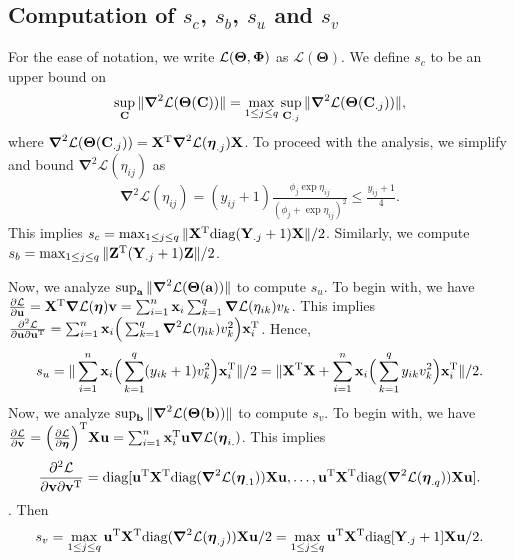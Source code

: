 \documentclass[12pt]{article}
\def\trans{^{\rm T}}
\newcommand{\bbL}{\mathcal{L}}
\newcommand{\bs}{\boldsymbol}
\begin{document}
\subsection{Computation of $s_c$, $s_b$, $s_u$ and $s_v$ } \label{par:comp_scale}
For the ease of notation, we write $ \bbL(\bs\Theta,\bPhi)$ as $ \bbL(\bs\Theta)$. 
We define $s_c$ to be an upper bound on %
\begin{align*}
\sup_{\C}\|\bs\nabla^2 \bbL(\bs\Theta({\C}))\|  = \max_{1\leq j \leq q} \sup_{\C_{.j}}\|\bs\nabla^2 \bbL(\bs\Theta({\C_{.j}}))\|, 
\end{align*}
where $\bs\nabla^2 \bbL(\bs\Theta({\C_{.j}})) = \X\trans \bs\nabla^2 \bbL(\bs\eta_{.j}) \X$. To proceed with the analysis, we simplify and bound   $\bs\nabla^2 \bbL(\eta_{ij}) $ as 
\begin{align*}
\bs\nabla^2 \bbL(\eta_{ij}) = (y_{ij} + 1)\frac{\phi_j \exp{\eta_{ij}} }{(\phi_j + \exp{\eta_{ij}})^2} \leq \frac{y_{ij} + 1}{4}. 
\end{align*}
This implies $s_c = \max_{1\leq j \leq q}  \|\X\trans\M{diag}(\Y_{.j}+1)\X \|/2$. Similarly, we compute $s_b = \max_{1\leq j \leq q}  \|\Z\trans(\Y_{.j}+1)\Z \|/2$. 

Now, we analyze $\sup_{\a}\|\bs\nabla^2 \bbL(\bs\Theta({\a}))\|$  to compute $s_u$.  To begin with, we have $\frac{\partial\bbL }{\partial \u} = \X\trans\bs\nabla \bbL(\bs\eta)\v = \sum_{i = 1}^n\x_i \sum_{k = 1}^q \bs\nabla \bbL(\eta_{ik})v_k$. This implies $\frac{\partial^2\bbL }{\partial \u\partial \u\trans}  = \sum_{i = 1}^n\x_i \Big( \sum_{k = 1}^q \bs\nabla^2 \bbL(\eta_{ik})v_k^2\Big) \x_i\trans$. Hence,
\begin{align*}
s_u = \|\sum_{i = 1}^n\x_i \Big( \sum_{k = 1}^q (y_{ik} + 1) v_k^2\Big) \x_i\trans\|/2 = \|\X\trans\X + \sum_{i = 1}^n\x_i \Big( \sum_{k = 1}^q y_{ik} v_k^2\Big) \x_i\trans\|/2.  
\end{align*}
Now, we analyze $\sup_{\b}\|\bs\nabla^2 \bbL(\bs\Theta({\b}))\|$  to compute $s_v$.  To begin with, we have $\frac{\partial\bbL }{\partial \v} =  \Big(\frac{\partial\bbL }{\partial \bs\eta} \Big)\trans\X\u = \sum_{i = 1}^n\x_i\trans \u  \bs\nabla \bbL(\bs\eta_{i.}) $. This implies 
$$
\frac{\partial^2\bbL }{\partial \v\partial \v\trans}  = \M{diag}[\u\trans\X\trans \M{diag}(\bs\nabla^2 \bbL(\bs\eta_{.1})) \X\u,\ldots, \u\trans\X\trans \M{diag}(\bs\nabla^2 \bbL(\bs\eta_{.q})) \X\u].  
$$. Then
\begin{align*}
s_v = \max_{1\leq j \leq q}\u\trans\X\trans \M{diag}(\bs\nabla^2 \bbL(\bs\eta_{.j})) \X\u/2 = \max_{1\leq j \leq q}\u\trans\X\trans \M{diag}[\Y_{.j} + 1] \X\u/2 .  
\end{align*}
\end{document}
